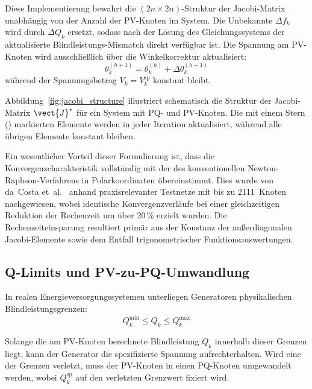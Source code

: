 Diese Implementierung bewahrt die $(2n \times 2n)$-Struktur der Jacobi-Matrix 
unabhängig von der Anzahl der PV-Knoten im System. Die Unbekannte $\Delta f_k$ 
wird durch $\Delta Q_k$ ersetzt, sodass nach der Lösung des Gleichungssystems der 
aktualisierte Blindleistungs-Mismatch direkt verfügbar ist. Die Spannung am 
PV-Knoten wird ausschließlich über die Winkelkorrektur aktualisiert:
\begin{equation}
	\theta_k^{(h+1)} = \theta_k^{(h)} + \Delta \theta_k^{(h+1)}
	\label{eq:pv_update}
\end{equation}
während der Spannungsbetrag $V_k = V_k^{\mathrm{sp}}$ konstant bleibt.

Abbildung~\ref{fig:jacobi_structure} illustriert schematisch die Struktur der 
Jacobi-Matrix $\vect{J}^*$ für ein System mit PQ- und PV-Knoten. Die mit einem 
Stern (\textasteriskcentered) markierten Elemente werden in jeder Iteration 
aktualisiert, während alle übrigen Elemente konstant bleiben.

Ein wesentlicher Vorteil dieser Formulierung ist, dass die Konvergenzcharakteristik 
vollständig mit der des konventionellen Newton-Raphson-Verfahrens in Polarkoordinaten 
übereinstimmt. Dies wurde von da~Costa et~al.\ \cite{DaCosta1999} anhand 
praxisrelevanter Testnetze mit bis zu 2111~Knoten nachgewiesen, wobei identische 
Konvergenzverläufe bei einer gleichzeitigen Reduktion der Rechenzeit um über 20\,\% 
erzielt wurden. Die Rechenzeiteinsparung resultiert primär aus der Konstanz der 
außerdiagonalen Jacobi-Elemente sowie dem Entfall trigonometrischer 
Funktionsauswertungen.

\subsection{Q-Limits und PV-zu-PQ-Umwandlung}\label{subsec:q_limits}

In realen Energieversorgungssystemen unterliegen Generatoren physikalischen 
Blindleistungsgrenzen:
\begin{equation}
	Q_k^{\min} \leq Q_k \leq Q_k^{\max}
	\label{eq:q_limits}
\end{equation}

Solange die am PV-Knoten berechnete Blindleistung $Q_k$ innerhalb dieser Grenzen 
liegt, kann der Generator die spezifizierte Spannung aufrechterhalten. Wird eine 
der Grenzen verletzt, muss der PV-Knoten in einen PQ-Knoten umgewandelt werden, 
wobei $Q_k^{\mathrm{sp}}$ auf den verletzten Grenzwert fixiert wird.

